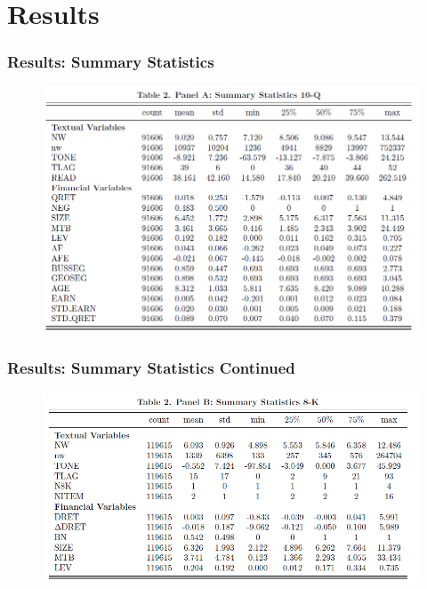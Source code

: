 \documentclass{beamer}
\begin{document}
\section{Results}
\begin{frame}
\frametitle{Results: Summary Statistics}
\begin{figure}[h]
	\centering
	\includegraphics[width=0.9\linewidth]{tab2panA}
	\label{tab2panA}
\end{figure}

\end{frame}
\begin{frame}
	\frametitle{Results: Summary Statistics Continued}
	\begin{figure}[h]
		\centering
		\includegraphics[width=0.9\linewidth]{tab2panB}
		\label{tab2panB}
	\end{figure}
	
\end{frame}
\end{document}
